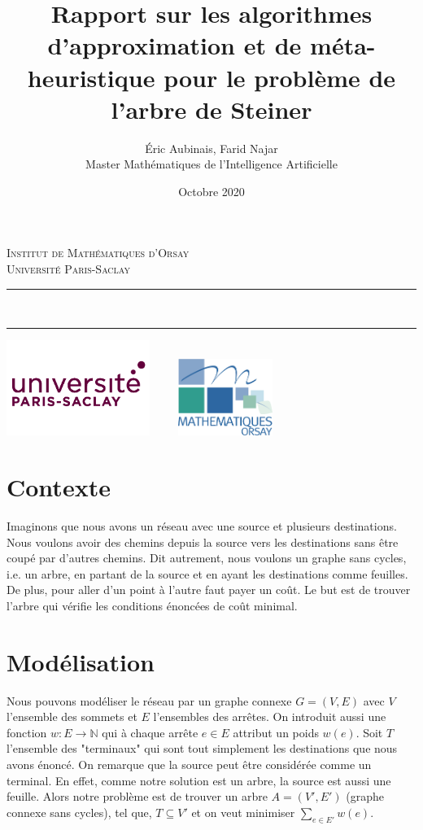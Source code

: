 \documentclass[11pt,french]{report}
\newcommand{\HRule}{\rule{\linewidth}{0.5mm}}
\begin{document}
	\title{Rapport sur les algorithmes d'approximation et de méta-heuristique pour le problème de l'arbre de Steiner\\}
	\author{
		Éric Aubinais, Farid Najar\\[0.2cm]
		Master Mathématiques de l'Intelligence Artificielle }
	\date{Octobre 2020}
	\makeatletter
	\begin{titlepage}
		\centering
		\textsc{\LARGE Institut de Mathématiques d'Orsay \\ Université Paris-Saclay}\\[4cm]
		\HRule \\
		{ \huge \bfseries \@title[2cm] }
		\begin{Large}
			\@author
		\end{Large}
		\HRule
		\vfill
		\includegraphics[width=0.35\textwidth]{paris-saclay.png}
		\hfill
		\includegraphics[width=0.35\textwidth, height=2.5cm]{imo.png}
		\pagebreak
		\tableofcontents
		\pagebreak
	\end{titlepage}

	\section{Contexte}
	Imaginons que nous avons un réseau avec une source et plusieurs destinations. Nous voulons avoir des chemins depuis la source vers les destinations sans être coupé par d'autres chemins. Dit autrement, nous voulons un graphe sans cycles, i.e. un arbre, en partant de la source et en ayant les destinations comme feuilles. De plus, pour aller d'un point à l'autre faut payer un coût. Le but est de trouver l'arbre qui vérifie les conditions énoncées de coût minimal.
	\section{Modélisation}
	Nous pouvons modéliser le réseau par un graphe connexe $G = (V, E)$ avec $V$ l'ensemble des sommets et $E$ l'ensembles des arrêtes. On introduit aussi une fonction $w:E\rightarrow \mathbb{N}$ qui à chaque arrête $e\in E$ attribut un poids $w(e)$. Soit $T$ l'ensemble des "terminaux" qui sont tout simplement les destinations que nous avons énoncé. On remarque que la source peut être considérée comme un terminal. En effet, comme notre solution est un arbre, la source est aussi une feuille. Alors notre problème est de trouver un arbre $A = (V', E')$ (graphe connexe sans cycles), tel que, $T\subseteq V'$ et on veut minimiser $\sum_{e\in E'}w(e)$.
\end{document}
